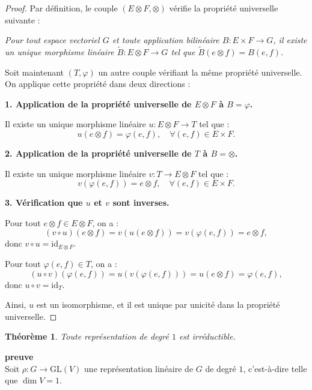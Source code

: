 \documentclass[12pt]{article}
\newtheorem{theoreme}{Théorème}
\begin{document}
	\begin{proof}
	Par définition, le couple \( (E \otimes F, \otimes) \) vérifie la propriété universelle suivante :
		
		\emph{Pour tout espace vectoriel \( G \) et toute application bilinéaire \( B : E \times F \to G \), il existe un unique morphisme linéaire \( \tilde{B} : E \otimes F \to G \) tel que \( \tilde{B}(e \otimes f) = B(e, f) \).}
		
		Soit maintenant \( (T, \varphi) \) un autre couple vérifiant la même propriété universelle.  
		On applique cette propriété dans deux directions :
		
		\textbf{1. Application de la propriété universelle de \( E \otimes F \) à \( B = \varphi \).}
		
		Il existe un unique morphisme linéaire \( u : E \otimes F \to T \) tel que :
		\[
		u(e \otimes f) = \varphi(e, f), \quad \forall (e,f) \in E \times F.
		\]
		
		\textbf{2. Application de la propriété universelle de \( T \) à \( B = \otimes \).}
		
		Il existe un unique morphisme linéaire \( v : T \to E \otimes F \) tel que :
		\[
		v(\varphi(e, f)) = e \otimes f, \quad \forall (e,f) \in E \times F.
		\]
		
		\textbf{3. Vérification que \( u \) et \( v \) sont inverses.}
		
		Pour tout \( e \otimes f \in E \otimes F \), on a :
		\[
		(v \circ u)(e \otimes f) = v(u(e \otimes f)) = v(\varphi(e, f)) = e \otimes f,
		\]
		donc \( v \circ u = \mathrm{id}_{E \otimes F} \).
		
		Pour tout \( \varphi(e, f) \in T \), on a :
		\[
		(u \circ v)(\varphi(e, f)) = u(v(\varphi(e, f))) = u(e \otimes f) = \varphi(e, f),
		\]
		donc \( u \circ v = \mathrm{id}_T \).
		
		Ainsi, \( u \) est un isomorphisme, et il est unique par unicité dans la propriété universelle.
		
	\end{proof}
	
	
	
	
	\begin{theoreme}
		Toute représentation de degré \(1\) est irréductible.
	\end{theoreme}
	
	\textbf{preuve}\\
		Soit \( \rho : G \to \mathrm{GL}(V) \) une représentation linéaire de \( G \) de degré \( 1 \), c’est-à-dire telle que \( \dim V = 1 \). 
		
\end{document}
